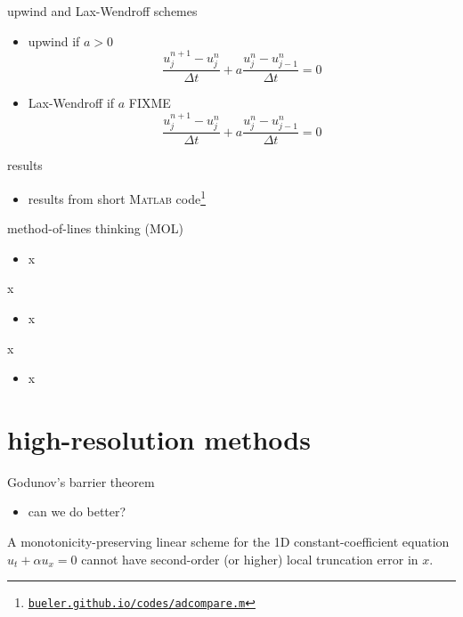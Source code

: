 \documentclass[10pt,hyperref]{beamer}
\newcommand{\Matlab}{\textsc{Matlab}\xspace}
\begin{document}
\begin{frame}{upwind and Lax-Wendroff schemes}

\begin{itemize}
\item upwind if $a>0$
    $$\frac{u_j^{n+1} - u_j^n}{\Delta t} + a \frac{u_j^n - u_{j-1}^n}{\Delta t} = 0$$
\item Lax-Wendroff if $a$ FIXME
    $$\frac{u_j^{n+1} - u_j^n}{\Delta t} + a \frac{u_j^n - u_{j-1}^n}{\Delta t} = 0$$
\end{itemize}
\end{frame}


\begin{frame}{results}

\begin{itemize}
\item results from short \Matlab code\footnote{\href{http://bueler.github.io/codes/adcompare.m}{\texttt{bueler.github.io/codes/adcompare.m}}}
\end{itemize}
\end{frame}


\begin{frame}{method-of-lines thinking (MOL)}

\begin{itemize}
\item x
\end{itemize}
\end{frame}


\begin{frame}{x}

\begin{itemize}
\item x
\end{itemize}
\end{frame}


\begin{frame}{x}

\begin{itemize}
\item x
\end{itemize}
\end{frame}


\section{high-resolution methods}

\begin{frame}{Godunov's barrier theorem}

\begin{itemize}
\item can we do better?
\end{itemize}

\begin{theorem}  A monotonicity-preserving linear scheme for the 1D constant-coefficient equation $u_t + \alpha u_x=0$ cannot have second-order (or higher) local truncation error in $x$.\end{theorem}
\end{frame}
\end{document}
